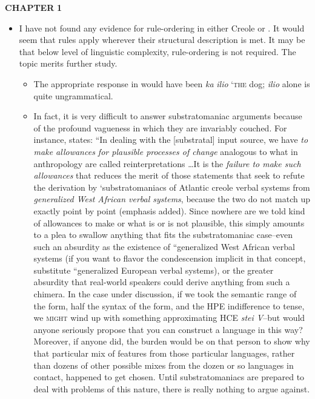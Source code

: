 
\textbf{CHAPTER} \textbf{1}

\begin{itemize}
\item I have not found any evidence for rule-ordering in either Creole  or . It would seem that rules apply wherever their structural description is met. It may be that below level of linguistic complexity, rule-ordering is not required. The topic merits further study.

\begin{itemize}
\item The appropriate response in  would have been \textit{ka} \textit{ilio} `\textsc{the} dog; \textit{ilio} alone is quite ungrammatical.
\end{itemize}



\begin{itemize}
\item In fact, it is very difficult to answer substratomaniac argu\-ments because of the profound vagueness in which they are invariably couched. For instance, \citet{Alleyne1979} states: ``In dealing with the [substratal] input source, we have \textit{to make allowances for plausible processes of change} analogous to what in anthropology are called reinterpretations \ldots  It is the \textit{failure to make such allowances} that reduces the merit of those statements that seek to refute the derivation by `substratomaniacs of Atlantic creole verbal systems from \textit{generalized West African verbal systems}, because the two do not match up exactly point by point (emphasis added). Since nowhere are we told kind of allowances to make or what is or is not plausible, this simply amounts to a plea to swallow anything that fits the substratomaniac case--even such an absurdity as the existence of ``generalized West African verbal systems (if you want to flavor the condescension implicit in that concept, substitute ``generalized European verbal systems), or the greater absurdity that real-world speakers could derive anything from such a chimera. In the case under discussion, if we took the semantic range of the  form, half the syntax of the  form, and the HPE indifference to tense, we \textsc{might} wind up with something approximating HCE \textit{stei V}--but would anyone seriously propose that you can construct a language in this way? Moreover, if anyone did, the burden would be on that person to show why that particular mix of features from those particular languages, rather than dozens of other possible mixes from the dozen or so lan\-guages in contact, happened to get chosen. Until substratomaniacs are prepared to deal with problems of this nature, there is really nothing to argue against.


\end{itemize}
\end{itemize}
